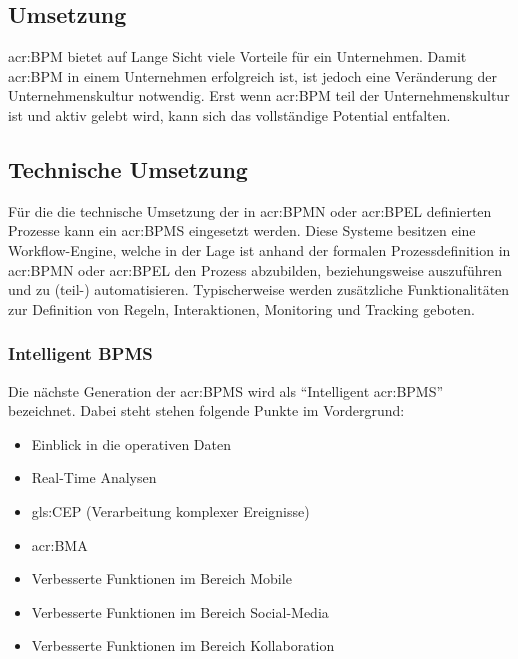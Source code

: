 \subsection{Umsetzung}
\gls{acr:BPM} bietet auf Lange Sicht viele Vorteile für ein Unternehmen. Damit \gls{acr:BPM} in einem Unternehmen erfolgreich ist, ist jedoch eine Veränderung der Unternehmenskultur notwendig. Erst wenn \gls{acr:BPM} teil der Unternehmenskultur ist und aktiv gelebt wird, kann sich das vollständige Potential entfalten.

\subsection{Technische Umsetzung}
Für die die technische Umsetzung der in \gls{acr:BPMN} oder \gls{acr:BPEL} definierten Prozesse kann ein \gls{acr:BPMS} eingesetzt werden. Diese Systeme besitzen eine Workflow-Engine, welche in der Lage ist anhand der formalen Prozessdefinition in \gls{acr:BPMN} oder \gls{acr:BPEL} den Prozess abzubilden, beziehungsweise auszuführen und zu (teil-) automatisieren. Typischerweise werden zusätzliche Funktionalitäten zur Definition von Regeln, Interaktionen, Monitoring und Tracking geboten.

\subsubsection{Intelligent BPMS}
Die nächste Generation der \gls{acr:BPMS} wird als "`Intelligent \gls{acr:BPMS}"' bezeichnet. Dabei steht stehen folgende Punkte im Vordergrund:

\begin{itemize}
\item Einblick in die operativen Daten
\item Real-Time Analysen
\item \gls{gls:CEP} (Verarbeitung komplexer Ereignisse)
\item \gls{acr:BMA}
\item Verbesserte Funktionen im Bereich Mobile
\item Verbesserte Funktionen im Bereich Social-Media
\item Verbesserte Funktionen im Bereich Kollaboration
\end{itemize}
